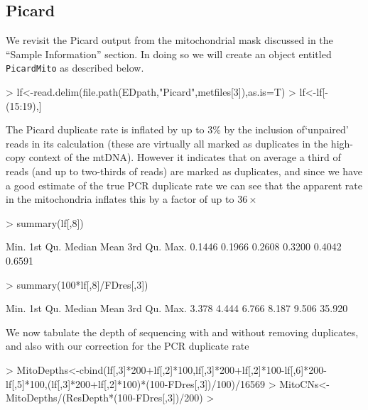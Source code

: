 \documentclass{article}
\begin{document}
\subsection{Picard}

We revisit the Picard output from the mitochondrial mask discussed in the ``Sample Information'' section. In doing so we will create an object entitled \texttt{PicardMito} as described below.

\begin{Schunk}
\begin{Sinput}
> lf<-read.delim(file.path(EDpath,"Picard",metfiles[3]),as.is=T)
> lf<-lf[-(15:19),]
\end{Sinput}
\end{Schunk}

The Picard duplicate rate is inflated by up to 3\% by the inclusion of`unpaired' reads in its calculation (these are virtually all marked as duplicates in the high-copy context of the mtDNA). However it indicates that on average a third of reads (and up to two-thirds of reads) are marked as duplicates, and since we have a good estimate of the true PCR duplicate rate we can see that the apparent rate in the mitochondria inflates this by a factor of up to $36\times$

\begin{Schunk}
\begin{Sinput}
> summary(lf[,8])
\end{Sinput}
\begin{Soutput}
   Min. 1st Qu.  Median    Mean 3rd Qu.    Max. 
 0.1446  0.1966  0.2608  0.3200  0.4042  0.6591 
\end{Soutput}
\begin{Sinput}
> summary(100*lf[,8]/FDres[,3])
\end{Sinput}
\begin{Soutput}
   Min. 1st Qu.  Median    Mean 3rd Qu.    Max. 
  3.378   4.444   6.766   8.187   9.506  35.920 
\end{Soutput}
\end{Schunk}

We now tabulate the depth of sequencing with and without removing duplicates, and also with our correction for the PCR duplicate rate

\begin{Schunk}
\begin{Sinput}
> MitoDepths<-cbind(lf[,3]*200+lf[,2]*100,lf[,3]*200+lf[,2]*100-lf[,6]*200-lf[,5]*100,(lf[,3]*200+lf[,2]*100)*(100-FDres[,3])/100)/16569
> MitoCNs<-MitoDepths/(ResDepth*(100-FDres[,3])/200)
> 
\end{Sinput}
\end{Schunk}
\end{document}
